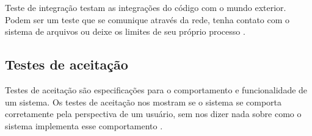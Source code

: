 Teste de integração testam as integrações do código com o mundo exterior. Podem ser um teste que se comunique através da rede, tenha contato com o sistema de arquivos ou deixe os limites de seu próprio processo \cite{ArtOfAgileDevelopment}.


\subsection{Testes de aceitação}
\label{sub:testes_de_aceitacao}

Testes de aceitação são especificações para o comportamento e funcionalidade de um sistema. Os testes de aceitação nos mostram se o sistema se comporta corretamente pela perspectiva de um usuário, sem nos dizer nada sobre como o sistema implementa esse comportamento \cite{TestDrivenKoskela}.


